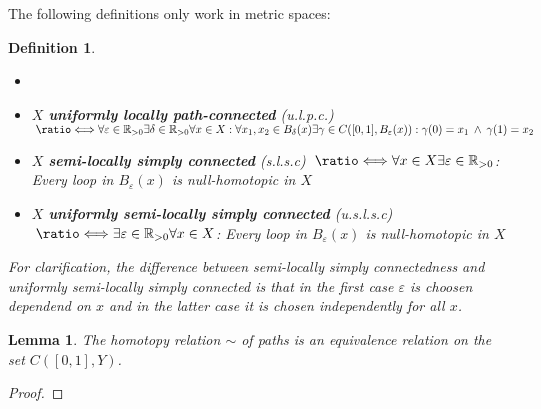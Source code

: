 \documentclass{article}
\newcommand{\R}[0]{\mathbb{R}}
\newcommand*{\longeq}{\ratio\Longleftrightarrow}
\theoremstyle{break}
\theoremstyle{break}
\newtheorem{defin}[thm]{Definition}
\newtheorem{lemma}[thm]{Lemma}
\begin{document}
The following definitions only work in metric spaces:

\begin{defin}
  \begin{itemize}
    \item[] %
    \item $X$ \textbf{uniformly locally path-connected} (u.l.p.c.) $\: \longeq \\ \forall \varepsilon \in \R_{>0} \exists \delta \in \R_{>0}\forall x \in X: \forall x_1, x_2 \in B_{\delta}(x)\exists \gamma \in C([0,1], B_{\varepsilon}(x)): \gamma(0) = x_1 \: \land \: \gamma(1) = x_2$
    \item $X$ \textbf{semi-locally simply connected} (s.l.s.c) $\: \longeq \\ \forall x\in X\exists \varepsilon \in \R_{>0}$: Every loop in $B_{\varepsilon}(x)$ is null-homotopic in $X$
    \item $X$ \textbf{uniformly semi-locally simply connected} (u.s.l.s.c) $\: \longeq \\ \exists \varepsilon \in \R_{>0}\forall x\in X$: Every loop in $B_{\varepsilon}(x)$ is null-homotopic in $X$
  \end{itemize}
  \vspace*{10pt}
  For clarification, the difference between semi-locally simply connectedness and uniformly semi-locally simply connected is 
  that in the first case $\varepsilon$ is choosen dependend on $x$ and in the latter case it is chosen independently for all $x$.
\end{defin}

\begin{lemma} \label{lem:homotopy-equivalence}
  The homotopy relation $\sim$ of paths is an equivalence relation on the set $C([0,1],Y)$.
\end{lemma}

\begin{proof}
  
\end{proof}
\end{document}
